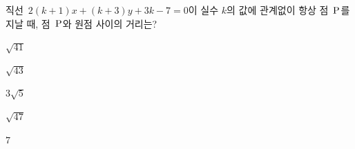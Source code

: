 직선~$2(k+1)x+(k+3)y+3k-7=0$이 실수 $k$의 값에 관계없이 항상 점~$\mathrm{P}$를 지날 때, 점~$\mathrm{P}$와 원점 사이의 거리는?
\begin{choices32}{\rule[-3ex]{0pt}{8ex}$\sqrt{41}$}{\rule[-3ex]{0pt}{8ex}$\sqrt{43}$}{\rule[-3ex]{0pt}{8ex}$3\sqrt{5}$}{\rule[-3ex]{0pt}{8ex}$\sqrt{47}$}{\rule[-3ex]{0pt}{8ex}$7$}\end{choices32}
